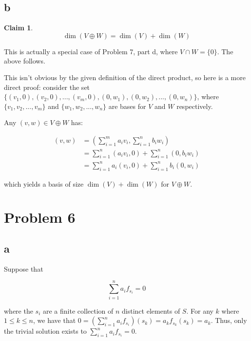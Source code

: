 \documentclass[12pt,letterpaper]{article}
\theoremstyle{definition}
\newtheorem*{claim}{Claim}
\newcommand{\R}{\mathbb{R}}
\newcommand{\Zg}{\mathbb{Z}_{>0}}
\begin{document}
\subsection*{b}

\begin{claim}
  \[
    \dim(V \oplus W) = \dim(V) + \dim(W)
  \]
\end{claim}

This is actually a special case of Problem 7, part d, where $V \cap W = \{0\}$. The
above follows.

This isn't obvious by the given definition of the direct product, so here is a
more direct proof: consider the set $\{(v_1, 0), (v_2, 0), ..., (v_m, 0),
(0, w_1), (0, w_2), ..., (0, w_n)\}$, where $\{v_1, v_2, ..., v_m\}$ and
$\{w_1, w_2, ..., w_n\}$ are bases for $V$ and $W$ respectively.

Any $(v, w) \in V \oplus W$ has:

\begin{align*}
  (v, w) &= (\sum_{i=1}^ma_iv_i, \sum_{i=1}^nb_iw_i) \\
         &= \sum_{i=1}^n(a_iv_i, 0) + \sum_{i=1}^n(0, b_iw_i) \\
         &= \sum_{i=1}^na_i(v_i, 0) + \sum_{i=1}^nb_i(0, w_i) 
\end{align*}

which yields a basis of size $\dim(V) + \dim(W)$ for $V \oplus W$.

\section*{Problem 6}

\subsection*{a}

Suppose that

\[
  \sum_{i=1}^na_if_{s_i} = 0
\]

where the $s_i$ are a finite collection of $n$ distinct elements of $S$. For
any $k$ where $1 \leq k \leq n$, we have that $0 = (\sum_{i=1}^na_if_{s_i})(s_k) =
a_kf_{s_k}(s_k) = a_k$. Thus, only the trivial solution exists to
$\sum_{i=1}^na_if_{s_i} = 0$. 

\end{document}
